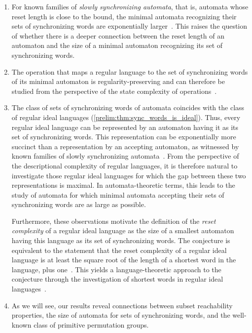 \begin{enumerate}
\item For known families of \emph{slowly synchronizing automata}, that is, automata whose reset length is close to the \Cerny bound, the minimal automata recognizing their sets of synchronizing words are exponentially larger~\cite{DBLP:journals/corr/Maslennikova14,DBLP:journals/ijfcs/Maslennikova19}. 
This raises the question of whether there is a deeper connection between the reset length of an automaton and the size of a minimal automaton recognizing its set of synchronizing words.

\item The operation that maps a regular language to the set of synchronizing words of its minimal automaton is regularity-preserving and can therefore be studied from the perspective of the state complexity of operations~\cite{GaoMRY17,YuZhuangSalomaa1994}.

\item The class of sets of synchronizing words of automata coincides with the class of regular ideal languages (\cref{prelim:thm:sync_words_is_ideal}). Thus, every regular ideal language can be represented by an automaton having it as its set of synchronizing words. This representation can be exponentially more succinct than a representation by an accepting automaton, 
as witnessed by known families of slowly synchronizing automata~\cite{DBLP:journals/corr/Maslennikova14,DBLP:journals/ijfcs/Maslennikova19}. From the perspective of the descriptional complexity of regular languages, it is therefore natural to investigate those regular ideal languages for which the gap between these two representations is maximal. In automata-theoretic terms, this leads to the study of automata for which minimal automata accepting their sets of synchronizing words are as large as possible.

Furthermore, these observations motivate the definition of the \emph{reset complexity} of a regular ideal language as the size of a smallest automaton having this language as its set of synchronizing words. The \Cerny conjecture is equivalent to the statement that the reset complexity of a regular ideal language is at least the square root of the length of a shortest word in the language, plus one~\cite{DBLP:journals/corr/Maslennikova14,DBLP:journals/ijfcs/Maslennikova19}. 
This yields a language-theoretic approach to the \Cerny conjecture through the investigation of shortest words in regular ideal languages~\cite{DBLP:journals/jalc/FrigeriR25,
	DBLP:journals/jalc/FrigeriR19,
	GusevMP13,
	DBLP:journals/fuin/MaslennikovaR18,
	ReisR16,
	DBLP:journals/aam/Rodaro18}.

	
\item As we will see, our results reveal connections between subset reachability properties,
the size of automata for sets of synchronizing words, and the well-known class of primitive permutation groups.
\end{enumerate}

